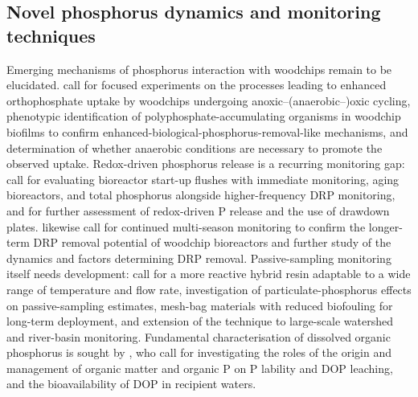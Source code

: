 \subsection{Novel phosphorus dynamics and monitoring techniques}
Emerging mechanisms of phosphorus interaction with woodchips remain to be elucidated. \textcite{Zhang2024b} call for focused experiments on the processes leading to enhanced orthophosphate uptake by woodchips undergoing anoxic--(anaerobic--)oxic cycling, phenotypic identification of polyphosphate-accumulating organisms in woodchip biofilms to confirm enhanced-biological-phosphorus-removal-like mechanisms, and determination of whether anaerobic conditions are necessary to promote the observed uptake. Redox-driven phosphorus release is a recurring monitoring gap: \textcite{Bailon2025} call for evaluating bioreactor start-up flushes with immediate monitoring, aging bioreactors, and total phosphorus alongside higher-frequency DRP monitoring, and for further assessment of redox-driven P release and the use of drawdown plates. \textcite{Rivas2020} likewise call for continued multi-season monitoring to confirm the longer-term DRP removal potential of woodchip bioreactors and further study of the dynamics and factors determining DRP removal. Passive-sampling monitoring itself needs development: \textcite{Li2020b} call for a more reactive hybrid resin adaptable to a wide range of temperature and flow rate, investigation of particulate-phosphorus effects on passive-sampling estimates, mesh-bag materials with reduced biofouling for long-term deployment, and extension of the technique to large-scale watershed and river-basin monitoring. Fundamental characterisation of dissolved organic phosphorus is sought by \textcite{Liu2024b}, who call for investigating the roles of the origin and management of organic matter and organic P on P lability and DOP leaching, and the bioavailability of DOP in recipient waters.

